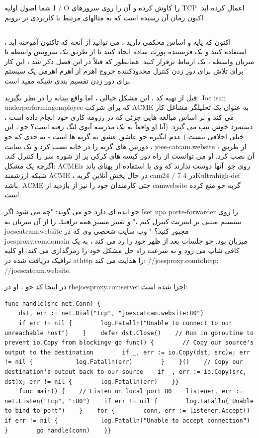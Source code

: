 \documentclass[12pt]{book}
\begin{document}
{شما اصول اولیه I / O را کاوش کرده و آن را روی سرورهای TCP اعمال کرده اید. اکنون زمان آن رسیده است که به مثالهای مرتبط با کاربردی تر برویم.
\subsection{}
اکنون که پایه و اساس محکمی دارید ، می توانید از آنچه که تاکنون آموخته اید ، استفاده کنید و یک فرستنده پورت ساده ایجاد کنید تا از طریق یک سرویس واسطه یا میزبان واسطه ، یک ارتباط برقرار کنید. همانطور که قبلاً در این فصل ذکر شد ، این کار برای تلاش برای دور زدن کنترل محدودکننده خروج اهرم از اهرم اهرمی یک سیستم برای دور زدن تقسیم بندی شبکه مفید است.

قبل از تهیه کد ، این مشکل خیالی ، اما واقع بینانه را در نظر بگیرید: Joe isan underperformingemployee که برای شرکت ACME به عنوان یک تحلیلگر مشاغل کار می کند و بر اساس مبالغه هایی جزئی که در رزومه کاری خود انجام داده است ، دستمزد خوش تیپ می گیرد. (آیا او واقعاً به یک مدرسه آیوی لیگ رفته است؟ جو ، این خیلی اخلاقی نیست.) عدم انگیزه جو عاشق عشق به گربه ها است - به حدی که جو دوربین های گربه را در خانه نصب کرد و یک سایت ، joes-catcam.website ، از طریق آن نصب کرد. او می توانست از راه دور کیسه های کرکی پر از شوره سر را کنترل کند. اگرچه یک مشکل: ACMEis روی جو. آنها دوست ندارند که وی با استفاده از پهنای باند شبکه ارزشمند ACME ، در حال پخش آنلاین گربه cam24 / 7 در 4Kultrahigh-def باشد. ACME حتی کارمندان خود را نیز از بازدید از camwebsite گربه جو منع کرده است.

جو ایده ای دارد جو می گوید: "چه می شود اگر Iset upa porte-forwarder را روی سیستم مبتنی بر اینترنت کنترل كنم ،" و تغییر مسیر همه ترافیك را از آن میزبان به joescatcam.website مجبور كنید؟ " وب سایت شخصی وی که در joesproxy.comdomain میزبان بود. جو جلسات بعد از ظهر خود را رد می کند ، به یک کافی شاپ می رود و به سرعت راه حل مشکل خود را رمزگذاری می کند. او کلیه ترافیک دریافت شده در athttp را هدایت می کند: //joesproxy.comtohttp: //joescatcam.website.

در اینجا کد جو ، او در thejoesproxy.comserver اجرا شده است:

\begin{latin}
	\begin{lstlisting}
func handle(src net.Conn) {
	dst, err := net.Dial("tcp", "joescatcam.website:80")
	if err != nil {        log.Fatalln("Unable to connect to our unreachable host")    }    defer dst.Close()    // Run in goroutine to prevent io.Copy from blockingv go func() {        // Copy our source's output to the destination        if _, err := io.Copy(dst, src)w; err != nil {            log.Fatalln(err)        }    }()    // Copy our destination's output back to our source    if _, err := io.Copy(src, dst)x; err != nil {        log.Fatalln(err)    }}
	func main() {    // Listen on local port 80    listener, err := net.Listen("tcp", ":80")    if err != nil {        log.Fatalln("Unable to bind to port")    }    for {        conn, err := listener.Accept()        if err != nil {            log.Fatalln("Unable to accept connection")        }        go handle(conn)    }}
	\end{lstlisting}
\end{latin}

}
\end{document}
